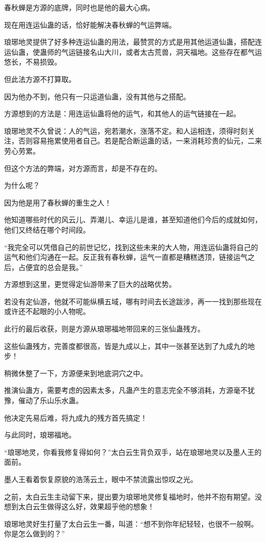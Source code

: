 \begin{this_body}
春秋蝉是方源的底牌，同时也是他的最大心病。

现在用连运仙蛊的话，恰好能解决春秋蝉的气运弊端。

琅琊地灵提供了好多种连运仙蛊的用法，最赞赏的方式是用其他运道仙蛊，搭配连运仙蛊，使蛊师的气运链接名山大川，或者太古荒兽，洞天福地。这些存在都气运悠长，不易损毁。

但此法方源不打算取。

因为他办不到，他只有一只运道仙蛊，没有其他与之搭配。

方源想到的方法是：用连运仙蛊将他的运气，和其他人的运气链接在一起。

琅琊地灵不久曾说：人的气运，宛若潮水，涨落不定。和人运相连，须得时刻关注，否则容易拖累使用者自己。若是配合断运蛊的话，一来消耗珍贵的仙元，二来劳心劳累。

但这个方法的弊端，对方源而言，却是不存在的。

为什么呢？

因为他是用了春秋蝉的重生之人！

他知道哪些时代的风云儿、弄潮儿、幸运儿是谁，甚至知道他们今后的成就如何，他们又终结在哪个时间段。

“我完全可以凭借自己的前世记忆，找到这些未来的大人物，用连运仙蛊将自己的运气和他们沟通在一起。反正我有春秋蝉，运气一直都是糟糕透顶，链接运气之后，占便宜的总会是我。”

方源想到这里，更觉得定仙游带来了巨大的战略优势。

若没有定仙游，他就不可能纵横五域，哪有时间去长途跋涉，再一一找到那些现在或许还不起眼的小人物呢。

此行的最后收获，则是方源从琅琊福地带回来的三张仙蛊残方。

这些仙蛊残方，完善度都很高，皆是九成以上，其中一张甚至达到了九成九的地步！

稍微休整了一下，方源便来到地底洞穴之中。

推演仙蛊方，需要考虑的因素太多，凡蛊产生的意志完全不够消耗，方源毫不犹豫，催动了乐山乐水蛊。

他决定先易后难，将九成九的残方首先搞定！

与此同时，琅琊福地。

“琅琊地灵，你看我修复得如何？”太白云生背负双手，站在琅琊地灵以及墨人王的面前。

墨人王看着恢复原貌的浩荡云土，眼中不禁流露出惊叹之光。

之前，太白云生主动留下来，提出要为琅琊地灵修复福地时，他并不抱有期望。没想到太白云生做得这么好，效果超乎他的想象！

琅琊地灵好生打量了太白云生一番，叫道：“想不到你年纪轻轻，也很不一般啊。你是怎么做到的？”


\end{this_body}
